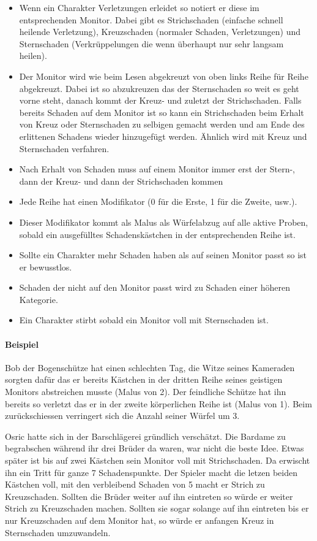 \documentclass{article}
\begin{document}
\begin{itemize}
\item Wenn ein Charakter Verletzungen erleidet so notiert er diese im entsprechenden Monitor. Dabei gibt es Strichschaden (einfache schnell heilende Verletzung), Kreuzschaden (normaler Schaden, Verletzungen) und Sternschaden (Verkrüppelungen die wenn überhaupt nur sehr langsam heilen).
\item Der Monitor wird wie beim Lesen abgekreuzt von oben links Reihe für Reihe abgekreuzt. Dabei ist so abzukreuzen das der Sternschaden so weit es geht vorne steht, danach kommt der Kreuz- und zuletzt der Strichschaden. Falls bereits Schaden auf dem Monitor ist so kann ein Strichschaden beim Erhalt von Kreuz oder Sternschaden zu selbigen gemacht werden und am Ende des erlittenen Schadens wieder hinzugefügt werden. Ähnlich wird mit Kreuz und Sternschaden verfahren.
\item Nach Erhalt von Schaden muss auf einem Monitor immer erst der Stern-, dann der Kreuz- und dann der Strichschaden kommen
\item Jede Reihe hat einen Modifikator (0 für die Erste, 1 für die Zweite, usw.).
\item Dieser Modifikator kommt als Malus als Würfelabzug auf alle aktive Proben, sobald ein ausgefülltes Schadenskästchen in der entsprechenden Reihe ist.
\item Sollte ein Charakter mehr Schaden haben als auf seinen Monitor passt so ist er bewusstlos.
\item Schaden der nicht auf den Monitor passt wird zu Schaden einer höheren Kategorie.
\item Ein Charakter stirbt sobald ein Monitor voll mit Sternschaden ist.
\end{itemize}

\paragraph{Beispiel}

Bob der Bogenschütze hat einen schlechten Tag, die Witze seines Kameraden sorgten dafür das er bereits Kästchen in
der dritten Reihe seines geistigen Monitors abstreichen musste (Malus von 2). Der feindliche Schütze hat ihn bereits
so verletzt das er in der zweite körperlichen Reihe ist (Malus von 1). Beim zurückschiessen verringert sich die
Anzahl seiner Würfel um 3.

Osric hatte sich in der Barschlägerei gründlich verschätzt. Die Bardame zu begrabschen während ihr drei Brüder da
waren, war nicht die beste Idee. Etwas später ist bis auf zwei Kästchen sein Monitor voll mit Strichschaden. Da
erwischt ihn ein Tritt für ganze 7 Schadenspunkte. Der Spieler macht die letzen beiden Kästchen voll, mit den
verbleibend Schaden von 5 macht er Strich zu Kreuzschaden. Sollten die Brüder weiter auf ihn eintreten so würde er
weiter Strich zu Kreuzschaden machen. Sollten sie sogar solange auf ihn eintreten bis er nur Kreuzschaden auf dem
Monitor hat, so würde er anfangen Kreuz in Sternschaden umzuwandeln.
\end{document}
